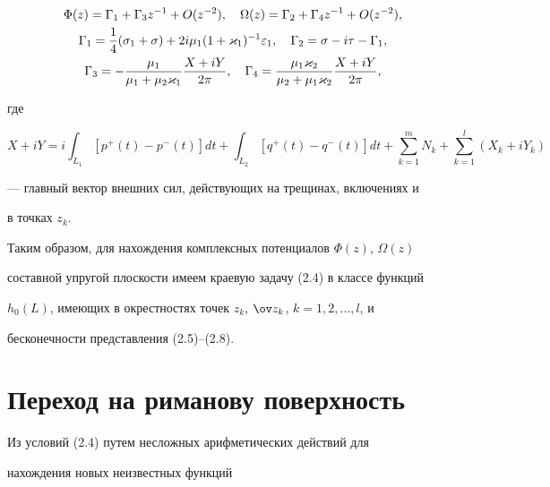 \begin{gather} 


\Phi(z)=\Gamma_1+\Gamma_3z^{-1}+O(z^{-2}),\quad 


\Omega(z)=\Gamma_2+\Gamma_4z^{-1}+O(z^{-2}),\\ 


\Gamma_1=\frac{1}{4}(\sigma_1+\sigma)+2i\mu_1(1+\varkappa_1)^{-1} 


\varepsilon_1,\quad \Gamma_2=\sigma-i\tau-\Gamma_1,\notag \\ 


%


\Gamma_3=-\frac{\mu_1}{\mu_1+\mu_2\varkappa_1} 


\frac{X+iY}{2\pi},\quad \Gamma_4=\frac{\mu_1\varkappa_2} 


{\mu_2+\mu_1\varkappa_2}\frac{X+iY}{2\pi},\notag 


\end{gather} 


где 


$$ 


X+iY=i\int_{L_1}[p^+(t)-p^-(t)]dt+\int_{L_2}[q^+(t)-q^-(t)]dt+ 


\sum^m_{k=1}N_k+\sum^l_{k=1}(X_k+iY_k) 


$$ 


--- главный вектор внешних сил, действующих на трещинах, включениях и 


в точках $z_k$. 


 


Таким образом, для нахождения комплексных потенциалов $\Phi(z)$, $\Omega(z)$ 


составной упругой плоскости имеем краевую задачу (2.4) в классе функций 


$h_0(L)$, имеющих в окрестностях точек $z_k$, $\ov z_k$, $k=1,2,\dotsc,l$, и 


бесконечности представления (2.5)--(2.8). 


 


 


\section{Переход на риманову поверхность} 


 


Из условий (2.4) путем несложных арифметических действий для 


нахождения новых неизвестных функций 


